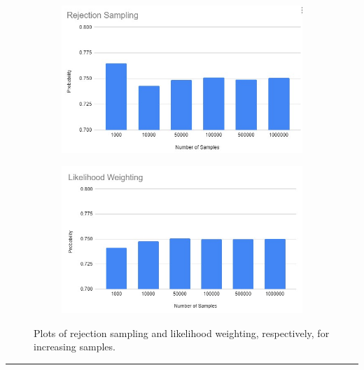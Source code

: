 \documentclass[12pt]{article}
\begin{document}
\begin{enumerate}[label=(\alph*)]
    \begin{figure}
          \begin{subfigure}{0.5\textwidth}
            \centering
            \includegraphics[width=\textwidth]{images/prob3/graphresults/3ba.jpg}
            \caption{}
            \label{fig:fig3a}
          \end{subfigure}
          \begin{subfigure}{0.5\textwidth}
            \centering
            \includegraphics[width=\textwidth]{images/prob3/graphresults/3bb.jpg}
            \caption{}
            \label{fig:fig3b}
          \end{subfigure}
          \caption{Plots of rejection sampling and likelihood weighting, respectively, for increasing samples.}
    \end{figure}
    
\end{enumerate}

\rule{\linewidth}{0.4pt}
\vspace{.2cm}
\end{document}
